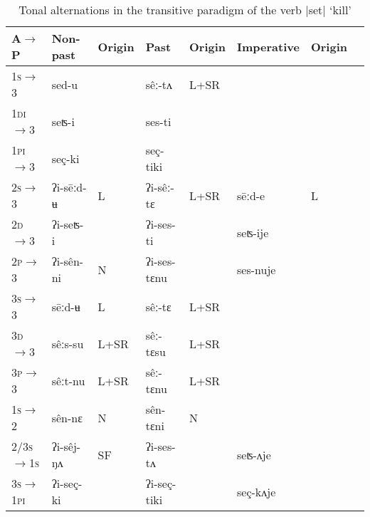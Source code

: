 \documentclass[oldfontcommands,oneside,a4paper,11pt]{article}
\newcommand{\ipa}[1]{{\phon \mbox{#1}}} %
\begin{document}
\begin{table}[H]
\caption{Tonal alternations in the transitive paradigm of the verb |set| `kill' } \label{tab:trans.paradigm2} \centering
\begin{tabular}{llllllll}
\toprule
A$\rightarrow$P& Non-past & Origin & Past & Origin& Imperative& Origin\\
\midrule
\textsc{1s}$\rightarrow$3 & \ipa{sed-u} & & \ipa{sêː-tʌ} &L+SR  &  \\
\textsc{1di}$\rightarrow$3 & \ipa{seʦ-i} &  & \ipa{ses-ti}  & \\
\textsc{1pi}$\rightarrow$3 & \ipa{seç-ki} &  & \ipa{seç-tiki} \\
\textsc{2s}$\rightarrow$3 & \ipa{ʔi-sēːd-ʉ} & L  & \ipa{ʔi-sêː-tɛ} &L+SR  &\ipa{sēːd-e} & L\\
\textsc{2d}$\rightarrow$3 & \ipa{ʔi-seʦ-i} & &  \ipa{ʔi-ses-ti} & & \ipa{seʦ-ije} & \\
\textsc{2p}$\rightarrow$3 & \ipa{ʔi-sên-ni} & N & \ipa{ʔi-ses-tɛnu} & &\ipa{ses-nuje} &\\
\textsc{3s}$\rightarrow$3 & \ipa{sēːd-ʉ} & L &\ipa{sêː-tɛ} & L+SR\\
\textsc{3d}$\rightarrow$3 & \ipa{sêːs-su} &L+SR& \ipa{sêː-tɛsu}   & L+SR\\
\textsc{3p}$\rightarrow$3 & \ipa{sêːt-nu} & L+SR& \ipa{sêː-tɛnu} & L+SR\\
\midrule
\textsc{1s}$\rightarrow$2 & \ipa{sên-nɛ} &N& \ipa{sên-tɛni} &N\\
\textsc{2/3s$\rightarrow$1s} & \ipa{ʔi-sêj-ŋʌ} &SF &\ipa{ʔi-ses-tʌ} & &\ipa{seʦ-ʌje}\\
\textsc{3s$\rightarrow$1pi} & \ipa{ʔi-seç-ki} & &\ipa{ʔi-seç-tiki} & &\ipa{seç-kʌje}\\
\bottomrule
\end{tabular}
\end{table}
\end{document}
